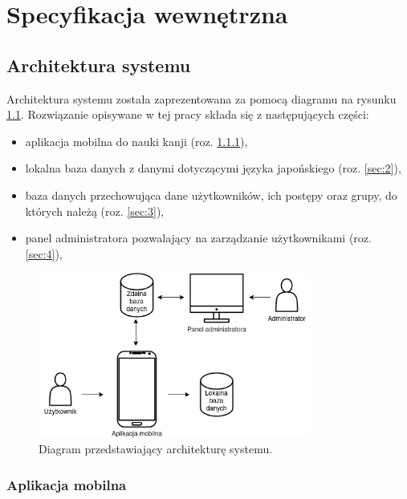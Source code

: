 \documentclass[a4paper,twoside,12pt]{book}
\newcommand{\ksremark}[1]{%
{%
{\color{brickred}{[#1]}}}%
\addcontentsline{rks}{uwagas}{\protect{#1}}%
}
\begin{document}
\chapter{Specyfikacja wewnętrzna}
\label{ch:05}


\section{Architektura systemu}

Architektura systemu została zaprezentowana za pomocą diagramu na rysunku \ref{fig:archi}. Rozwiązanie opisywane w tej pracy składa się z następujących części:
\begin{itemize}
\item aplikacja mobilna do nauki kanji (roz. \ref{sec:1}),
\item lokalna baza danych z danymi dotyczącymi języka japońskiego (roz. \ref{sec:2}),
\item baza danych przechowująca dane użytkowników, ich postępy oraz grupy, do których należą (roz. \ref{sec:3}),
\item panel administratora pozwalający na zarządzanie użytkownikami (roz. \ref{sec:4}),
\end{itemize}

\begin{figure}[]
\centering
\includegraphics[width=0.8\textwidth]{archi}
\caption{Diagram przedstawiający architekturę systemu.}
\label{fig:archi}
\end{figure}

\subsection{Aplikacja mobilna}
\label{sec:1}
\end{document}
